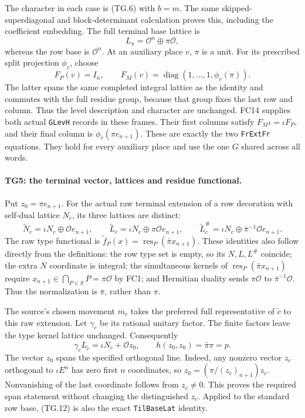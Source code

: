 \documentclass[11pt,a4paper]{article}
\numberwithin{equation}{section}
\theoremstyle{remark}\newtheorem{remark}[theorem]{Remark}
\begin{document}
The character in each case is (TG.6) with $b=m$. The same
skipped-superdiagonal and block-determinant calculation proves
this, including the coefficient embedding. The full terminal
base lattice is
\[
 L_\pi=\mathcal O^n\oplus\pi\mathcal O,
 \tag{TG.9}
\]
whereas the row base is $\mathcal O^n$. At an auxiliary place
$v$, $\pi$ is a unit. For its prescribed split projection
$\phi_v$, choose
\[
 F_P(v)=I_n,\qquad
 F_M(v)=\operatorname{diag}(1,\ldots,1,\phi_v(\pi)).
 \tag{TG.10}
\]
The latter spans the same completed integral lattice as the
identity and commutes with the full residue group, because that
group fixes the last row and column. Thus the level description
and character are unchanged. FC14 supplies both actual
\texttt{GLevH} records in these frames. Their first columns
satisfy $F_M\iota=\iota F_P$, and their final column is
$\phi_v(\pi e_{n+1})$. These are exactly the two
\texttt{FrExtFr} equations. They hold for every auxiliary place
and use the one $G$ shared across all words.

\paragraph{TG5: the terminal vector, lattices and residue functional.}
Put $z_0=\pi e_{n+1}$. For the actual raw terminal extension of a
row decoration with self-dual lattice $N_c$, its three lattices
are distinct:
\[
 \widetilde N_c=\iota N_c\oplus\mathcal Oe_{n+1},\qquad
 \widetilde L_c=\iota N_c\oplus\pi\mathcal Oe_{n+1},\qquad
 \widetilde L_c^{\#}=\iota N_c\oplus\bar\pi^{-1}
                                      \mathcal Oe_{n+1}.
 \tag{TG.11}
\]
The raw type functional is
$\widetilde f_P(x)=\operatorname{res}_P(\bar\pi x_{n+1})$.
These identities also follow directly from the definitions:
the row type set is empty, so its $N,L,L^{\#}$ coincide;
the extra $N$ coordinate is integral; the simultaneous kernels
of $\operatorname{res}_P(\bar\pi x_{n+1})$ require
$x_{n+1}\in\bigcap_{P\in S}P=\pi\mathcal O$ by FC1;
and Hermitian duality sends $\pi\mathcal O$ to
$\bar\pi^{-1}\mathcal O$. Thus the normalization is
$\bar\pi$, rather than $\pi$.

The source's chosen movement $m_c$ takes the preferred full
representative of $\widetilde c$ to this raw extension. Let
$\gamma_c$ be its rational unitary factor. The finite factors
leave the type kernel lattice unchanged. Consequently
\[
 \gamma_c L_{\widetilde c}
      =\iota N_c+\mathcal O z_0,
 \qquad h(z_0,z_0)=\bar\pi\pi=p.
 \tag{TG.12}
\]
The vector $z_0$ spans the specified orthogonal line. Indeed,
any nonzero vector $z_c$ orthogonal to $\iota E^n$ has zero first
$n$ coordinates, so $z_0=(\pi/(z_c)_{n+1})z_c$. Nonvanishing
of the last coordinate follows from $z_c\ne0$. This proves the
required span statement without changing the distinguished
$z_c$. Applied to the standard row base, (TG.12) is also the
exact \texttt{TilBaseLat} identity.
\end{document}

